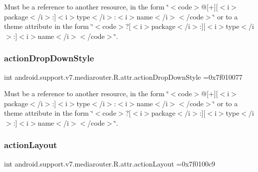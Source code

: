 Must be a reference to another resource, in the form \char`\"{}$<$code$>$@\mbox{[}+\mbox{]}\mbox{[}$<$i$>$package$<$/i$>$\+:\mbox{]}$<$i$>$type$<$/i$>$\+:$<$i$>$name$<$/i$>$$<$/code$>$\char`\"{} or to a theme attribute in the form \char`\"{}$<$code$>$?\mbox{[}$<$i$>$package$<$/i$>$\+:\mbox{]}\mbox{[}$<$i$>$type$<$/i$>$\+:\mbox{]}$<$i$>$name$<$/i$>$$<$/code$>$\char`\"{}. \mbox{\label{classandroid_1_1support_1_1v7_1_1mediarouter_1_1R_1_1attr_ac4639a46ffc10412d641f375f6506d21}} 
\subsubsection{\texorpdfstring{action\+Drop\+Down\+Style}{actionDropDownStyle}}
{\footnotesize\ttfamily int android.\+support.\+v7.\+mediarouter.\+R.\+attr.\+action\+Drop\+Down\+Style =0x7f010077\hspace{0.3cm}{\ttfamily [static]}}

Must be a reference to another resource, in the form \char`\"{}$<$code$>$@\mbox{[}+\mbox{]}\mbox{[}$<$i$>$package$<$/i$>$\+:\mbox{]}$<$i$>$type$<$/i$>$\+:$<$i$>$name$<$/i$>$$<$/code$>$\char`\"{} or to a theme attribute in the form \char`\"{}$<$code$>$?\mbox{[}$<$i$>$package$<$/i$>$\+:\mbox{]}\mbox{[}$<$i$>$type$<$/i$>$\+:\mbox{]}$<$i$>$name$<$/i$>$$<$/code$>$\char`\"{}. \mbox{\label{classandroid_1_1support_1_1v7_1_1mediarouter_1_1R_1_1attr_a8c4b337670729c8165afc211a5afc59a}} 
\subsubsection{\texorpdfstring{action\+Layout}{actionLayout}}
{\footnotesize\ttfamily int android.\+support.\+v7.\+mediarouter.\+R.\+attr.\+action\+Layout =0x7f0100c9\hspace{0.3cm}{\ttfamily [static]}}

